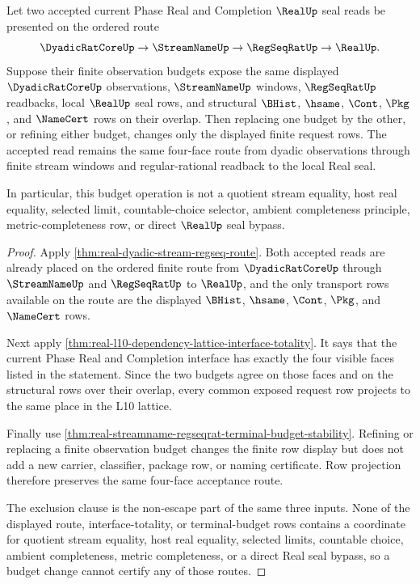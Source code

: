 \begin{theorem}
\label{thm:real-dyadic-stream-regseq-budget-exactness}
Let two accepted current Phase Real and Completion $\RealUp$ seal reads be
presented on the ordered route
$$
\DyadicRatCoreUp \to \StreamNameUp \to \RegSeqRatUp \to \RealUp .
$$
Suppose their finite observation budgets expose the same displayed
$\DyadicRatCoreUp$ observations, $\StreamNameUp$ windows, $\RegSeqRatUp$
readbacks, local $\RealUp$ seal rows, and structural $\BHist$, $\hsame$,
$\Cont$, $\Pkg$, and $\NameCert$ rows on their overlap. Then replacing one
budget by the other, or refining either budget, changes only the displayed
finite request rows. The accepted read remains the same four-face route from
dyadic observations through finite stream windows and regular-rational
readback to the local Real seal.

In particular, this budget operation is not a quotient stream equality, host
real equality, selected limit, countable-choice selector, ambient
completeness principle, metric-completeness row, or direct $\RealUp$ seal
bypass.
\end{theorem}
\begin{proof}
Apply \autoref{thm:real-dyadic-stream-regseq-route}. Both accepted reads are
already placed on the ordered finite route from $\DyadicRatCoreUp$ through
$\StreamNameUp$ and $\RegSeqRatUp$ to $\RealUp$, and the only transport rows
available on the route are the displayed $\BHist$, $\hsame$, $\Cont$, $\Pkg$,
and $\NameCert$ rows.

Next apply
\autoref{thm:real-l10-dependency-lattice-interface-totality}. It says that
the current Phase Real and Completion interface has exactly the four visible
faces listed in the statement. Since the two budgets agree on those faces and
on the structural rows over their overlap, every common exposed request row
projects to the same place in the L10 lattice.

Finally use
\autoref{thm:real-streamname-regseqrat-terminal-budget-stability}. Refining
or replacing a finite observation budget changes the finite row display but
does not add a new carrier, classifier, package row, or naming certificate.
Row projection therefore preserves the same four-face acceptance route.

The exclusion clause is the non-escape part of the same three inputs. None of
the displayed route, interface-totality, or terminal-budget rows contains a
coordinate for quotient stream equality, host real equality, selected limits,
countable choice, ambient completeness, metric completeness, or a direct Real
seal bypass, so a budget change cannot certify any of those routes.
\end{proof}

